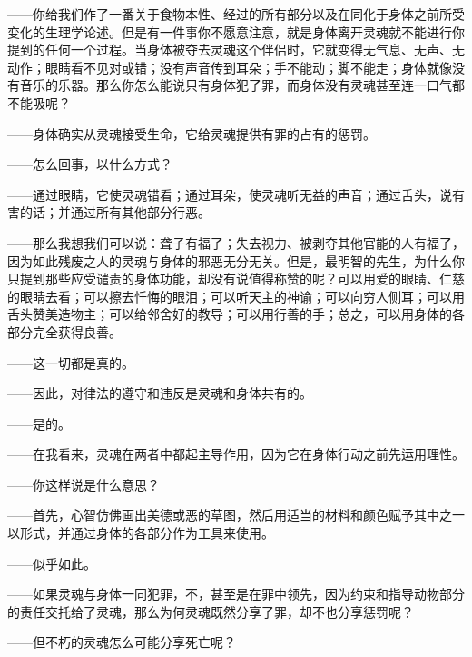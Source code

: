 ——你给我们作了一番关于食物本性、经过的所有部分以及在同化于身体之前所受变化的生理学论述。但是有一件事你不愿意注意，就是身体离开灵魂就不能进行你提到的任何一个过程。当身体被夺去灵魂这个伴侣时，它就变得无气息、无声、无动作；眼睛看不见对或错；没有声音传到耳朵；手不能动；脚不能走；身体就像没有音乐的乐器。那么你怎么能说只有身体犯了罪，而身体没有灵魂甚至连一口气都不能吸呢？\par

——身体确实从灵魂接受生命，它给灵魂提供有罪的占有的惩罚。\par

——怎么回事，以什么方式？\par

——通过眼睛，它使灵魂错看；通过耳朵，使灵魂听无益的声音；通过舌头，说有害的话；并通过所有其他部分行恶。\par

——那么我想我们可以说：聋子有福了；失去视力、被剥夺其他官能的人有福了，因为如此残废之人的灵魂与身体的邪恶无分无关。但是，最明智的先生，为什么你只提到那些应受谴责的身体功能，却没有说值得称赞的呢？可以用爱的眼睛、仁慈的眼睛去看；可以擦去忏悔的眼泪；可以听天主的神谕；可以向穷人侧耳；可以用舌头赞美造物主；可以给邻舍好的教导；可以用行善的手；总之，可以用身体的各部分完全获得良善。\par

——这一切都是真的。\par

——因此，对律法的遵守和违反是灵魂和身体共有的。\par

——是的。\par

——在我看来，灵魂在两者中都起主导作用，因为它在身体行动之前先运用理性。\par

——你这样说是什么意思？\par

——首先，心智仿佛画出美德或恶的草图，然后用适当的材料和颜色赋予其中之一以形式，并通过身体的各部分作为工具来使用。\par

——似乎如此。\par

——如果灵魂与身体一同犯罪，不，甚至是在罪中领先，因为约束和指导动物部分的责任交托给了灵魂，那么为何灵魂既然分享了罪，却不也分享惩罚呢？\par

——但不朽的灵魂怎么可能分享死亡呢？\par

